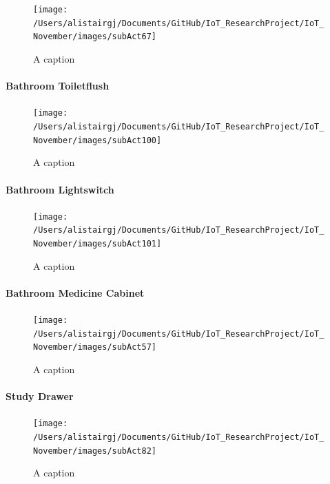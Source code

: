 \documentclass[11pt,]{article}
\let\oldparagraph\paragraph
\renewcommand{\paragraph}[1]{\oldparagraph{#1}\mbox{}}
\begin{document}
\begin{figure}[H]
\texttt{[image: /Users/alistairgj/Documents/GitHub/IoT\_ResearchProject/IoT\_November/images/subAct67]} \caption{A caption}\label{fig:subAct67}
\end{figure}

\hypertarget{bathroom-toiletflush}{%
\paragraph{Bathroom Toiletflush}\label{bathroom-toiletflush}}

\begin{figure}[H]
\texttt{[image: /Users/alistairgj/Documents/GitHub/IoT\_ResearchProject/IoT\_November/images/subAct100]} \caption{A caption}\label{fig:subAct100}
\end{figure}

\hypertarget{bathroom-lightswitch}{%
\paragraph{Bathroom Lightswitch}\label{bathroom-lightswitch}}

\begin{figure}[H]
\texttt{[image: /Users/alistairgj/Documents/GitHub/IoT\_ResearchProject/IoT\_November/images/subAct101]} \caption{A caption}\label{fig:subAct101}
\end{figure}

\hypertarget{bathroom-medicine-cabinet}{%
\paragraph{Bathroom Medicine Cabinet}\label{bathroom-medicine-cabinet}}

\begin{figure}[H]
\texttt{[image: /Users/alistairgj/Documents/GitHub/IoT\_ResearchProject/IoT\_November/images/subAct57]} \caption{A caption}\label{fig:subAct57}
\end{figure}

\hypertarget{study-drawer}{%
\paragraph{Study Drawer}\label{study-drawer}}

\begin{figure}[H]
\texttt{[image: /Users/alistairgj/Documents/GitHub/IoT\_ResearchProject/IoT\_November/images/subAct82]} \caption{A caption}\label{fig:subAct82}
\end{figure}
\end{document}
